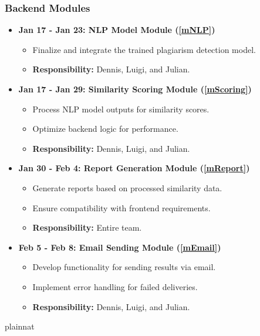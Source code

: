 \documentclass[12pt, titlepage]{article}
\begin{document}
\subsubsection{Backend Modules}
\begin{itemize}
    \item \textbf{Jan 17 - Jan 23: NLP Model Module (\ref{mNLP})}
    \begin{itemize}
        \item Finalize and integrate the trained plagiarism detection model.
        \item \textbf{Responsibility:} Dennis, Luigi, and Julian.
    \end{itemize}

    \item \textbf{Jan 17 - Jan 29: Similarity Scoring Module (\ref{mScoring})}
    \begin{itemize}
        \item Process NLP model outputs for similarity scores.
        \item Optimize backend logic for performance.
        \item \textbf{Responsibility:} Dennis, Luigi, and Julian.
    \end{itemize}

    \item \textbf{Jan 30 - Feb 4: Report Generation Module (\ref{mReport})}
    \begin{itemize}
        \item Generate reports based on processed similarity data.
        \item Ensure compatibility with frontend requirements.
        \item \textbf{Responsibility:} Entire team.
    \end{itemize}

    \item \textbf{Feb 5 - Feb 8: Email Sending Module (\ref{mEmail})}
    \begin{itemize}
        \item Develop functionality for sending results via email.
        \item Implement error handling for failed deliveries.
        \item \textbf{Responsibility:} Dennis, Luigi, and Julian.
    \end{itemize}
\end{itemize}

\vspace{0.5cm}



 {plainnat}


\newpage{}
\end{document}
